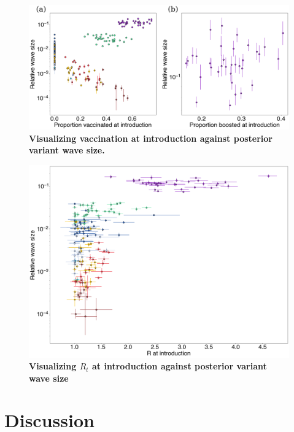 \documentclass[11pt,oneside,letterpaper]{article}
\begin{document}
\begin{figure}[t]
  \centering
  \includegraphics[width=\linewidth]{figs/vaccination_to_wave_size.png}
  \caption{\textbf{Visualizing vaccination at introduction against posterior variant wave size.}
  } %
  \label{fig:vaccination_to_wave_size}
\end{figure}

\begin{figure}[t]
  \centering
  \includegraphics[width=\linewidth]{figs/intro_R_to_wave_size.png}
  \caption{\textbf{Visualizing $R_{t}$ at introduction against posterior variant wave size}
  }
  \label{fig:intro_R_to_wave_size}
\end{figure}



\section*{Discussion}
\end{document}

